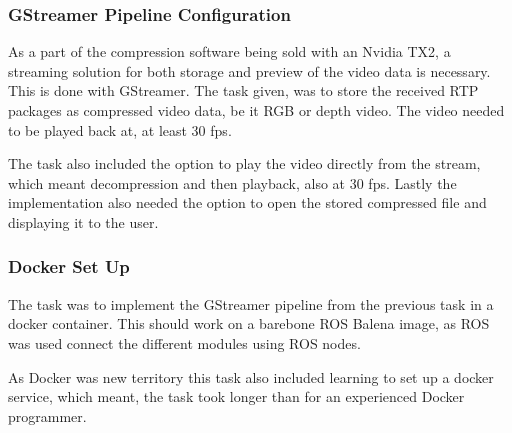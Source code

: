 \subsubsection{GStreamer Pipeline Configuration}
As a part of the compression software being sold with an Nvidia TX2, a streaming solution for both storage and preview of the video data is necessary. This is done with GStreamer. The task given, was to store the received RTP packages as compressed video data, be it RGB or depth video. The video needed to be played back at, at least 30 \gls{fps}.

The task also included the option to play the video directly from the stream, which meant decompression and then playback, also at 30 \gls{fps}. Lastly the implementation also needed the option to open the stored compressed file and displaying it to the user.

\subsubsection{Docker Set Up}
The task was to implement the GStreamer pipeline from the previous task in a docker container. This should work on a barebone ROS Balena image, as ROS was used connect the different modules using ROS nodes. 

As Docker was new territory this task also included learning to set up a docker service, which meant, the task took longer than for an experienced Docker programmer.